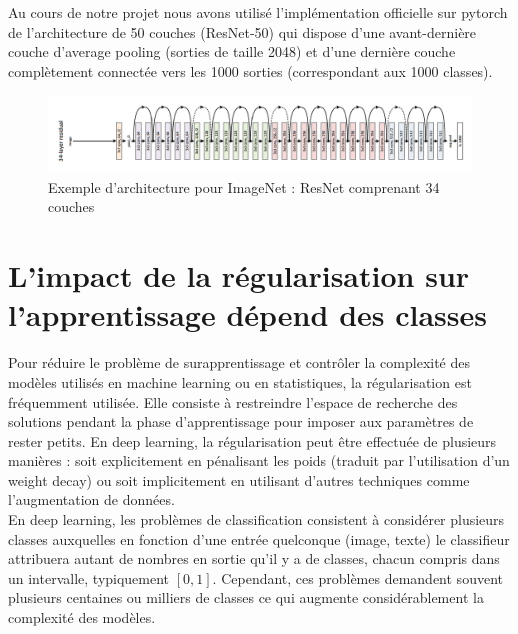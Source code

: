 \documentclass[12pt,english, openany]{book}
\begin{document}
Au cours de notre projet nous avons utilisé l'implémentation officielle sur pytorch de l'architecture de 50 couches (ResNet-50) qui dispose d'une avant-dernière couche d'average pooling (sorties de taille 2048) et d'une dernière couche complètement connectée vers les 1000 sorties (correspondant aux 1000 classes).

\begin{figure}[ht]
  \centering
  \includegraphics[width=\textwidth]{images/resNet3.png}
  \caption{Exemple d'architecture pour ImageNet : ResNet comprenant 34 couches \cite{he2015deep}}
  \label{fig:ResNet_34}
\end{figure}

\section{L'impact de la régularisation sur l'apprentissage dépend des classes}

Pour réduire le problème de surapprentissage et contrôler la complexité des modèles utilisés en machine learning ou en statistiques, la régularisation est fréquemment utilisée. Elle consiste à restreindre l’espace de recherche des solutions pendant la phase d’apprentissage pour imposer aux paramètres de rester petits. En deep learning, la régularisation peut être effectuée de plusieurs manières : soit explicitement en pénalisant les poids (traduit par l'utilisation d'un weight decay) ou soit implicitement en utilisant d’autres techniques comme l’augmentation de données.\\ 

En deep learning, les problèmes de classification consistent à considérer plusieurs classes auxquelles en fonction d’une entrée quelconque (image, texte) le classifieur attribuera autant de nombres en sortie qu’il y a de classes, chacun compris dans un intervalle, typiquement $[0, 1]$. Cependant, ces problèmes demandent souvent plusieurs centaines ou milliers de classes ce qui augmente considérablement la complexité des modèles.\\
\end{document}
